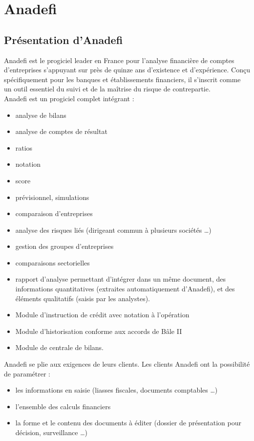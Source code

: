 \section{Anadefi}
\subsection{Présentation d'Anadefi}
Anadefi est le progiciel leader en France pour l’analyse financière de comptes d’entreprises s’appuyant sur près de quinze ans d’existence et d’expérience. Conçu spécifiquement pour les banques et établissements financiers, il s’inscrit comme un outil essentiel du suivi et de la maîtrise du risque de contrepartie.\\

{Anadefi est un progiciel complet intégrant :}
\begin{itemize}
\item analyse de bilans
\item analyse de comptes de résultat
\item ratios
\item notation
\item score
\item prévisionnel, simulations
\item comparaison d’entreprises
\item analyse des risques liés (dirigeant commun à plusieurs sociétés …)
\item gestion des groupes d’entreprises
\item comparaisons sectorielles
\item rapport d’analyse permettant d’intégrer dans un même document, des informations quantitatives (extraites automatiquement d’Anadefi), et des éléments qualitatifs (saisis par les analystes).
\item Module d’instruction de crédit avec notation à l’opération
\item Module d’historisation conforme aux accords de Bâle II
\item Module de centrale de bilans.\\
\end{itemize}

Anadefi se plie aux exigences de leurs clients.
{Les clients Anadefi ont la possibilité de paramétrer :}
\begin{itemize}
\item les informations en saisie (liasses fiscales, documents comptables …)
\item l’ensemble des calculs financiers
\item la forme et le contenu des documents à éditer (dossier de présentation pour décision, surveillance …)\\
\end{itemize}

